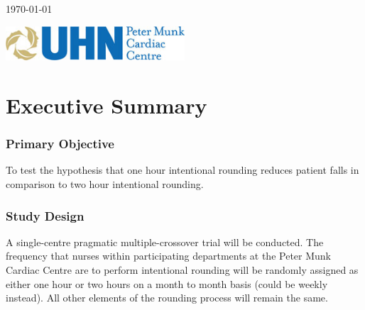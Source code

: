 \documentclass[12pt]{article}
\begin{document}
\begin{titlepage}

\begin{center}
{\large \today}
\end{center}


\newcommand*{\plogo}{\includegraphics[width=0.5\textwidth]{image001.jpg}}

\plogo\\[1cm] %
 

\vfill %
\end{titlepage}

\newpage
\tableofcontents
\newpage

\section{Executive Summary}
\subsubsection*{Primary Objective}
To test the hypothesis that one hour intentional rounding reduces patient falls in comparison to two hour intentional rounding. 
\subsubsection*{Study Design}
A single-centre pragmatic multiple-crossover trial will be conducted. The frequency that nurses within participating departments at the Peter Munk Cardiac Centre are to perform intentional rounding will be randomly assigned as either one hour or two hours on a month to month basis (could be weekly instead). All other elements of the rounding process will remain the same.
\end{document}
